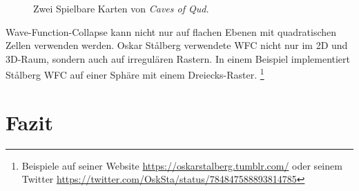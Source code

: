 \documentclass[12pt, a4paper,twoside,openright]{report} %
\begin{document}
\begin{figure}[H]
    \centering
    \caption{Zwei Spielbare Karten von \textit{Caves of Qud.} \cite{Karth2017WaveFunctionCollapseIC}}%
\end{figure}

Wave-Function-Collapse kann nicht nur auf flachen Ebenen mit quadratischen Zellen verwenden werden.
Oskar Stålberg verwendete WFC nicht nur im 2D und 3D-Raum, sondern auch auf irregulären Rastern.
In einem Beispiel implementiert Stålberg WFC auf einer Sphäre mit einem Dreiecks-Raster.
\footnote[7]{Beispiele auf seiner Website
\url{https://oskarstalberg.tumblr.com/}
oder seinem Twitter
\url{https://twitter.com/OskSta/status/784847588893814785}}

\chapter{Fazit}
\end{document}
